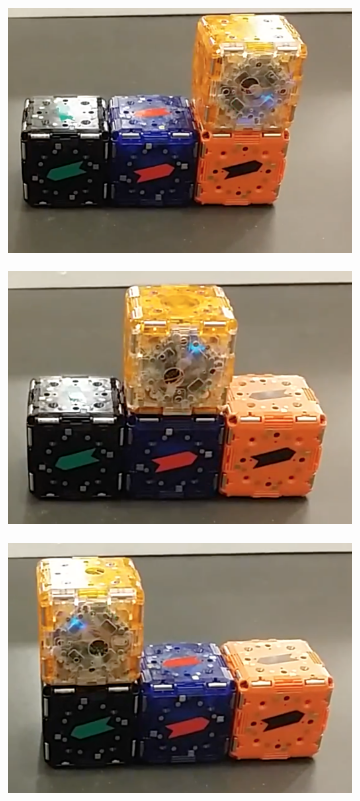 \begin{figure}[h]  
	\centering
	\begin{subfigure}[b]{0.32\linewidth}
		\includegraphics[width=0.95\linewidth]{figures/arrows2.png}
		\subcaption{} 
	\end{subfigure}
	\begin{subfigure}[b]{0.32\linewidth}
		\includegraphics[width=0.95\linewidth]{figures/arrows3.png}
		\subcaption{} 
	\end{subfigure}
	\begin{subfigure}[b]{0.32\linewidth}
		\includegraphics[width=0.95\linewidth]{figures/arrows4.png}
		\subcaption{} 
	\end{subfigure}
	

\end{figure}
